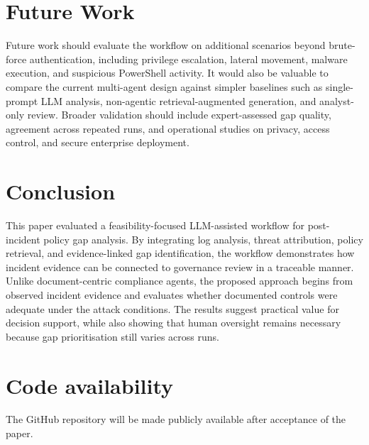 \documentclass[conference]{IEEEtran}
\begin{document}
\section{Future Work}
Future work should evaluate the workflow on additional scenarios beyond brute-force authentication, including privilege escalation, lateral movement, malware execution, and suspicious PowerShell activity. It would also be valuable to compare the current multi-agent design against simpler baselines such as single-prompt LLM analysis, non-agentic retrieval-augmented generation, and analyst-only review. Broader validation should include expert-assessed gap quality, agreement across repeated runs, and operational studies on privacy, access control, and secure enterprise deployment.

\section{Conclusion}
This paper evaluated a feasibility-focused LLM-assisted workflow for post-incident policy gap analysis. By integrating log analysis, threat attribution, policy retrieval, and evidence-linked gap identification, the workflow demonstrates how incident evidence can be connected to governance review in a traceable manner. Unlike document-centric compliance agents, the proposed approach begins from observed incident evidence and evaluates whether documented controls were adequate under the attack conditions. The results suggest practical value for decision support, while also showing that human oversight remains necessary because gap prioritisation still varies across runs.

\section{Code availability}
The GitHub repository will be made publicly available after acceptance of the paper.




\end{document}
